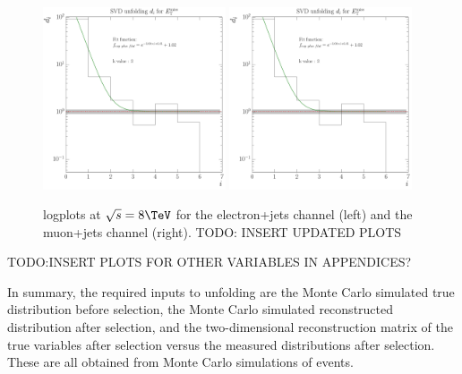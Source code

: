 \begin{figure}[hbtp]
    \centering
     \includegraphics[width=0.48\textwidth]{Chapters/04_Analysis/04b_XSections/images/unfolding_tests/8TeV/k_values/k_from_d_i_electron_channel_MET_data.pdf}\hfill
     \includegraphics[width=0.48\textwidth]{Chapters/04_Analysis/04b_XSections/images/unfolding_tests/8TeV/k_values/k_from_d_i_electron_channel_MET_data.pdf}\\
	 \caption{log\abs[d[i] plots at $\sqrt{s}=8\TeV$ for the electron+jets channel (left) and the muon+jets
	 channel (right). TODO: INSERT UPDATED PLOTS} %
     \label{fig:d_plots_7TeV}
\end{figure}



TODO:INSERT PLOTS FOR OTHER VARIABLES IN APPENDICES?

In summary, the required inputs to unfolding are the Monte Carlo simulated true distribution before
selection, the Monte Carlo simulated reconstructed distribution after selection, and the two-dimensional reconstruction
matrix of the true variables after selection versus the measured distributions after selection. These are all
obtained from Monte Carlo simulations of \ttbar events. 

